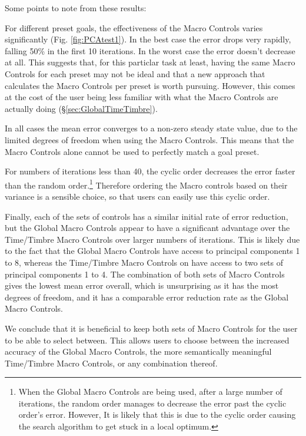 \documentclass[11pt, oneside]{report}   	%
\begin{document}
Some points to note from these results:

For different preset goals, the effectiveness of the Macro Controls varies significantly (Fig. \ref{fig:PCAtest1}). In the best case the error drops very rapidly, falling 50\% in the first 10 iterations. In the worst case the error doesn't decrease at all. This suggests that, for this particlar task at least, having the same Macro Controls for each preset may not be ideal and that a new approach that calculates the Macro Controls per preset is worth pursuing. However, this comes at the cost of the user being less familiar with what the Macro Controls are actually doing (\S \ref{sec:GlobalTimeTimbre}).

In all cases the mean error converges to a non-zero steady state value,  due to the limited degrees of freedom when using the Macro Controls. This means that the Macro Controls alone cannot be used to perfectly match a goal preset.

For numbers of iterations less than 40, the cyclic order decreases the error faster than the random order.\footnote{
When the Global Macro Controls are being used, after a large number of iterations, the random order manages to decrease the error past the cyclic order's error. However, It is likely that this is due to the cyclic order causing the search algorithm to get stuck in a local optimum.} Therefore ordering the Macro controls based on their variance is a sensible choice, so that users can easily use this cyclic order. 

Finally, each of the sets of controls has a similar initial rate of error reduction, but the Global Macro Controls appear to have a significant advantage over the Time/Timbre Macro Controls over larger numbers of iterations. This is likely due to the fact that the Global Macro Controls have access to principal components 1 to 8, whereas the Time/Timbre Macro Controls on have access to two sets of principal components 1 to 4. The combination of both sets of Macro Controls gives the lowest mean error overall, which is unsurprising as it has the most degrees of freedom, and it has a comparable error reduction rate as the Global Macro Controls.

We conclude that it is beneficial to keep both sets of Macro Controls for the user to be able to select between. This allows users to choose between the increased accuracy of the Global Macro Controls, the more semantically meaningful Time/Timbre Macro Controls, or any combination thereof.
\end{document}
